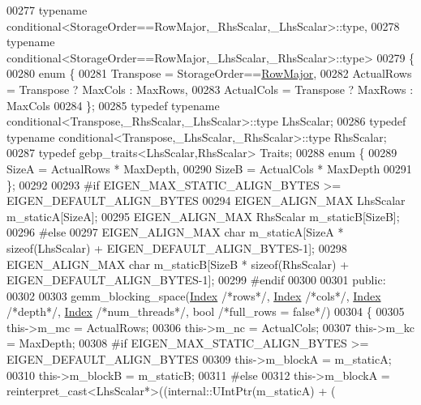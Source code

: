 \begin{DoxyCode}
00277       typename conditional<StorageOrder==RowMajor,\_RhsScalar,\_LhsScalar>::type,
00278       typename conditional<StorageOrder==RowMajor,\_LhsScalar,\_RhsScalar>::type>
00279 \{
00280     \textcolor{keyword}{enum} \{
00281       Transpose = StorageOrder==\hyperlink{group__enums_ggaacded1a18ae58b0f554751f6cdf9eb13acfcde9cd8677c5f7caf6bd603666aae3}{RowMajor},
00282       ActualRows = Transpose ? MaxCols : MaxRows,
00283       ActualCols = Transpose ? MaxRows : MaxCols
00284     \};
00285     \textcolor{keyword}{typedef} \textcolor{keyword}{typename} conditional<Transpose,\_RhsScalar,\_LhsScalar>::type LhsScalar;
00286     \textcolor{keyword}{typedef} \textcolor{keyword}{typename} conditional<Transpose,\_LhsScalar,\_RhsScalar>::type RhsScalar;
00287     \textcolor{keyword}{typedef} gebp\_traits<LhsScalar,RhsScalar> Traits;
00288     \textcolor{keyword}{enum} \{
00289       SizeA = ActualRows * MaxDepth,
00290       SizeB = ActualCols * MaxDepth
00291     \};
00292 
00293 \textcolor{preprocessor}{#if EIGEN\_MAX\_STATIC\_ALIGN\_BYTES >= EIGEN\_DEFAULT\_ALIGN\_BYTES}
00294     EIGEN\_ALIGN\_MAX LhsScalar m\_staticA[SizeA];
00295     EIGEN\_ALIGN\_MAX RhsScalar m\_staticB[SizeB];
00296 \textcolor{preprocessor}{#else}
00297     EIGEN\_ALIGN\_MAX \textcolor{keywordtype}{char} m\_staticA[SizeA * \textcolor{keyword}{sizeof}(LhsScalar) + EIGEN\_DEFAULT\_ALIGN\_BYTES-1];
00298     EIGEN\_ALIGN\_MAX \textcolor{keywordtype}{char} m\_staticB[SizeB * \textcolor{keyword}{sizeof}(RhsScalar) + EIGEN\_DEFAULT\_ALIGN\_BYTES-1];
00299 \textcolor{preprocessor}{#endif}
00300 
00301   \textcolor{keyword}{public}:
00302 
00303     gemm\_blocking\_space(\hyperlink{namespace_eigen_a62e77e0933482dafde8fe197d9a2cfde}{Index} \textcolor{comment}{/*rows*/}, \hyperlink{namespace_eigen_a62e77e0933482dafde8fe197d9a2cfde}{Index} \textcolor{comment}{/*cols*/}, \hyperlink{namespace_eigen_a62e77e0933482dafde8fe197d9a2cfde}{Index} \textcolor{comment}{/*depth*/}, 
      \hyperlink{namespace_eigen_a62e77e0933482dafde8fe197d9a2cfde}{Index} \textcolor{comment}{/*num\_threads*/}, \textcolor{keywordtype}{bool} \textcolor{comment}{/*full\_rows = false*/})
00304     \{
00305       this->m\_mc = ActualRows;
00306       this->m\_nc = ActualCols;
00307       this->m\_kc = MaxDepth;
00308 \textcolor{preprocessor}{#if EIGEN\_MAX\_STATIC\_ALIGN\_BYTES >= EIGEN\_DEFAULT\_ALIGN\_BYTES}
00309       this->m\_blockA = m\_staticA;
00310       this->m\_blockB = m\_staticB;
00311 \textcolor{preprocessor}{#else}
00312       this->m\_blockA = \textcolor{keyword}{reinterpret\_cast<}LhsScalar*\textcolor{keyword}{>}((internal::UIntPtr(m\_staticA) + (

\end{DoxyCode}
